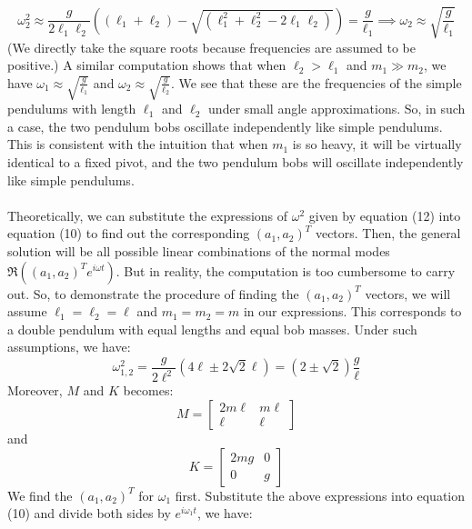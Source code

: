 \documentclass[11pt]{article}
\begin{document}
\begin{equation*}
  \omega_2^2 \approx \frac{g}{2\ell_1\ell_2}((\ell_1+\ell_2) - \sqrt{(\ell_1^2+\ell_2^2 - 2\ell_1\ell_2 )}) = \frac{g}{\ell_1}
  \implies \omega_2 \approx \sqrt{\frac{g}{\ell_1}}
\end{equation*}
(We directly take the square roots because frequencies are assumed to be positive.)
A similar computation shows that when \(\ell_2 >\ell_1\) and \(m_1\gg m_2\), we have \(\omega_1 \approx \sqrt{\frac{g}{\ell_1}}\)
and \(\omega_2 \approx \sqrt{\frac{g}{\ell_2}}\). We see that these are the frequencies of the simple pendulums with
length \(\ell_1\) and \(\ell_2\) under small angle approximations.
So, in such a case, the two pendulum bobs oscillate independently like simple pendulums.
This is consistent with the intuition that when \(m_1\) is so heavy, it will be virtually identical to a fixed pivot,
and the two pendulum bobs will oscillate independently like simple pendulums.\\
\\
Theoretically, we can substitute the expressions of \(\omega^2\) given by equation (12) into equation (10) to find out the corresponding \((a_1, a_2)^T\) vectors.
Then, the general solution will be all possible linear combinations of the normal modes \(\Re((a_1, a_2)^T e^{i\omega t})\).
But in reality, the computation is too cumbersome to carry out. So, to demonstrate the procedure
of finding the \((a_1, a_2)^T\) vectors, we will assume \(\ell_1=\ell_2 =\ell\) and \(m_1=m_2=m\) in our expressions.
This corresponds to a double pendulum with equal lengths and equal bob masses.
Under such assumptions, we have:
\begin{equation}
  \omega_{1,2}^2 = \frac{g}{2\ell^2}(4\ell \pm 2\sqrt{2}\ell) =  (2\pm \sqrt{2}) \frac{g}{\ell}
\end{equation}
Moreover, \(M\) and \(K\) becomes:
\begin{equation*}
  M =
  \begin{bmatrix}
    2m\ell & m\ell \\
    \ell & \ell
  \end{bmatrix}
\end{equation*}
and
\begin{equation*}
  K =
  \begin{bmatrix}
    2mg & 0\\
    0 & g
  \end{bmatrix}
\end{equation*}
We find the \((a_1, a_2)^T\) for \(\omega_1\) first. Substitute the above expressions into equation (10) and divide both sides by \(e^{i\omega_1 t}\), we have:
\end{document}
